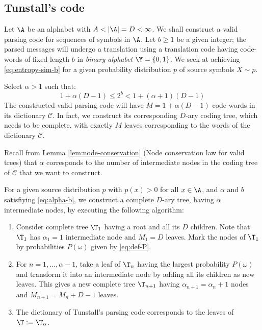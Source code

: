\documentclass[toc, titlepaged]{../cs-classes/cs-classes}
\begin{document}
\subsection{Tunstall's code}
Let $\A$ be an alphabet with $A<|\A|=D<\infty$. We shall construct a valid parsing code for sequences of symbols in $\A$. Let $b\geq1$ be a given integer; the parsed messages will undergo a translation using a translation code having code-words of fixed length $b$ in \emph{binary alphabet} $\Y=\{0, 1\}$. We seek at achieving \eqref{eq:entropy-sim-b} for a given probability distribution $p$ of source symbols $X\sim p$.

Select $\alpha>1$ such that:
\begin{equation}
    \label{eq:alpha-b}
    1 + \alpha(D-1)\leq2^b<1+(\alpha+1)(D-1)
\end{equation}
The constructed valid parsing code will have $M=1+\alpha(D-1)$ code words in its dictionary $\mathcal{C}$. In fact, we construct its corresponding $D$-ary coding tree, which needs to be complete, with exactly $M$ leaves corresponding to the words of the dictionary $\mathcal{C}$.

Recall from Lemma \ref{lem:node-conservation} (Node conservation law for valid trees) that $\alpha$ corresponds to the number of intermediate nodes in the coding tree of $\mathcal{C}$ that we want to construct.

\begin{definition}
    For a given source distribution $p$ with $p(x)>0$ for all $x\in\A$, and $\alpha$ and $b$ satisfiying \eqref{eq:alpha-b}, we construct a complete $D$-ary tree, having $\alpha$ intermediate nodes, by executing the following algorithm:
    \begin{enumerate}
        \item Consider complete tree $\T_1$ having a root and all its $D$ children. Note that $\T_1$ has $\alpha_1=1$ intermediate node and $M_1=D$ leaves. Mark the nodes of $\T_1$ by probabilities $P(\omega)$ given by \eqref{eq:def-P}.
        \item For $n=1, \dots, \alpha-1$, take a leaf of $\T_n$ having the largest probability $P(\omega)$ and transform it into an intermediate node by adding all its children as new leaves. This gives a new complete tree $\T_{n+1}$ having $\alpha_{n+1}=\alpha_n + 1$ nodes and $M_{n+1}=M_n+D-1$ leaves. 
        \item The dictionary of Tunstall's parsing code corresponds to the leaves of $\T:=\T_\alpha$.
    \end{enumerate}
\end{definition}
\end{document}
